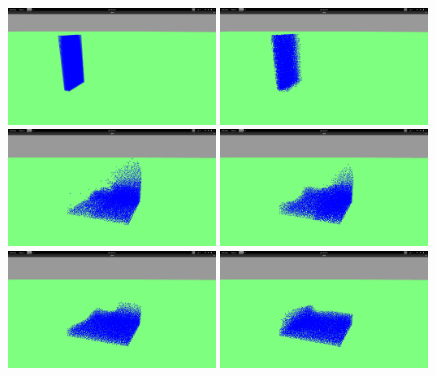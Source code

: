 \documentclass[polish, 12pt]{aghthesis}
\begin{document}
	\begin{figure}
	\centering
		\includegraphics[width=0.49\textwidth]{1.png}
		\includegraphics[width=0.49\textwidth]{2.png}
		\includegraphics[width=0.49\textwidth]{3.png}
		\includegraphics[width=0.49\textwidth]{4.png}
		\includegraphics[width=0.49\textwidth]{5.png}
		\includegraphics[width=0.49\textwidth]{6.png}

\end{figure}
\end{document}
